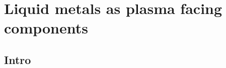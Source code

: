 \chapter{Liquid metals as plasma facing components}%
\label{chapter:State_of_the_art}
\section{Intro}

